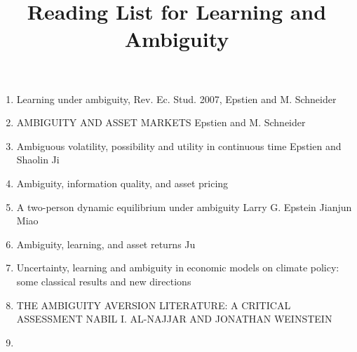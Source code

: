 \documentclass[12pt,letterpaper]{article}
\theoremstyle{definition}
\theoremstyle{plain}
\theoremstyle{plain}
\begin{document}
\linespread{1} %
\title{Reading List for Learning and Ambiguity}
\maketitle
\begin{enumerate}
	\item Learning under ambiguity, Rev. Ec. Stud. 2007, Epstien and  M. Schneider
	\item AMBIGUITY AND ASSET MARKETS Epstien and  M. Schneider
	\item Ambiguous volatility, possibility and utility in continuous time  Epstien and  Shaolin Ji
	\item Ambiguity, information quality, and asset pricing
\item A two-person dynamic equilibrium under ambiguity Larry G. Epstein  Jianjun Miao
\item Ambiguity, learning, and asset returns Ju
\item Uncertainty, learning and ambiguity in economic models on climate policy: some classical results and new directions
\item THE AMBIGUITY AVERSION LITERATURE: A CRITICAL ASSESSMENT NABIL I. AL-NAJJAR AND JONATHAN WEINSTEIN
\item 
\end{enumerate}
\end{document}
